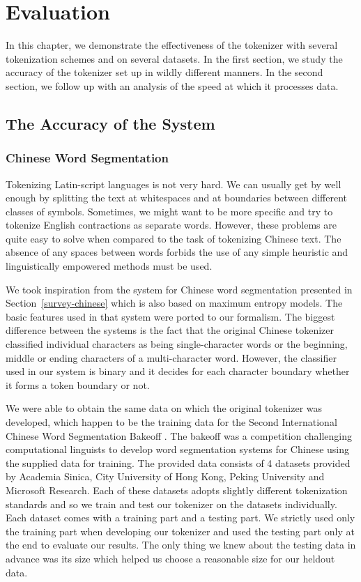 \chapter{Evaluation}
\label{chap:eval}

In this chapter, we demonstrate the effectiveness of the tokenizer with several
tokenization schemes and on several datasets. In the first section, we study
the accuracy of the tokenizer set up in wildly different manners. In the
second section, we follow up with an analysis of the speed at which it
processes data.

\section{The Accuracy of the System}
\label{sec:eval-acc}

\subsection{Chinese Word Segmentation}
\label{ssec:eval-acc-chinese}

Tokenizing Latin-script languages is not very hard. We can usually get by well
enough by splitting the text at whitespaces and at boundaries between different
classes of symbols. Sometimes, we might want to be more specific and try to
tokenize English contractions as separate words. However, these problems are
quite easy to solve when compared to the task of tokenizing Chinese text. The
absence of any spaces between words forbids the use of any simple heuristic and
linguistically empowered methods must be used.

We took inspiration from the system for Chinese word segmentation presented in
Section~\ref{survey-chinese} \cite{seg-chinese-maxent} which is also based on
maximum entropy models. The basic features used in that system were ported to
our formalism. The biggest difference between the systems is the fact that the
original Chinese tokenizer classified individual characters as being
single-character words or the beginning, middle or ending characters of a
multi-character word. However, the classifier used in our system is binary and
it decides for each character boundary whether it forms a token boundary or
not.

We were able to obtain the same data on which the original tokenizer was
developed, which happen to be the training data for the Second International
Chinese Word Segmentation Bakeoff \cite{web-bakeoff}. The bakeoff was a
competition challenging computational linguists to develop word segmentation
systems for Chinese using the supplied data for training. The provided data
consists of 4 datasets provided by Academia Sinica, City University of Hong
Kong, Peking University and Microsoft Research. Each of these datasets adopts
slightly different tokenization standards and so we train and test our
tokenizer on the datasets individually. Each dataset comes with a training part
and a testing part. We strictly used only the training part when developing our
tokenizer and used the testing part only at the end to evaluate our results.
The only thing we knew about the testing data in advance was its size which
helped us choose a reasonable size for our heldout data.

